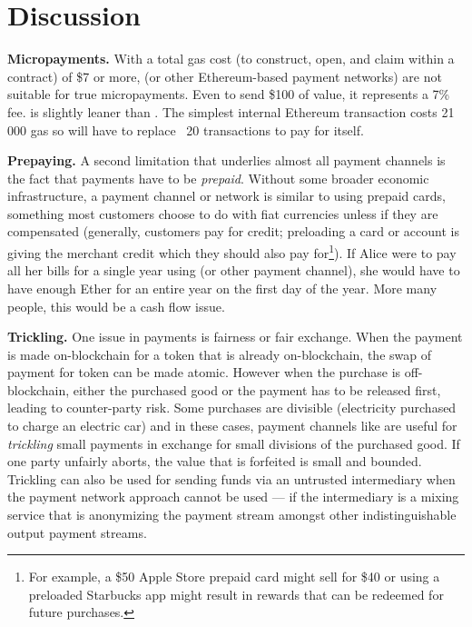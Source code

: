 
\section{Discussion}

\textbf{Micropayments.} With a total gas cost (to construct, open, and claim within a contract) of \$7 or more, \ew (or other Ethereum-based payment networks) are not suitable for true micropayments. Even to send \$100 of value, it represents a 7\% fee. \eww is slightly leaner than \ew {}. The simplest internal Ethereum transaction costs 21\,000 gas so \ew will have to replace ~20 transactions to pay for itself. 

\textbf{Prepaying.} A second limitation that underlies almost all payment channels is the fact that payments have to be \textit{prepaid}. Without some broader economic infrastructure, a payment channel or network is similar to using prepaid cards, something most customers choose to do with fiat currencies unless if they are  compensated (generally, customers pay for credit; preloading a card or account is giving the merchant credit which they should also pay for\footnote{For example, a \$50 Apple Store prepaid card might sell for \$40 or using a preloaded Starbucks app might result in rewards that can be redeemed for future purchases.}). If Alice were to pay all her bills for a single year using \ew (or other payment channel), she would have to have enough Ether for an entire year on the first day of the year. More many people, this would be a cash flow issue. 

\textbf{Trickling.} One issue in payments is fairness or fair exchange. When the payment is made on-blockchain for a token that is already on-blockchain, the swap of payment for token can be made atomic. However when the purchase is off-blockchain, either the purchased good or the payment has to be released first, leading to counter-party risk. Some purchases are divisible (\eg electricity purchased to charge an electric car) and in these cases, payment channels like \ew are useful for \textit{trickling} small payments in exchange for small divisions of the purchased good. If one party unfairly aborts, the value that is forfeited is small and bounded. Trickling can also be used for sending funds via an untrusted intermediary when the payment network approach cannot be used --- \eg if the intermediary is a mixing service that is anonymizing the payment stream amongst other indistinguishable output payment streams.

